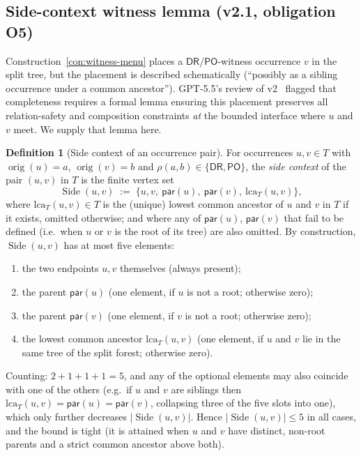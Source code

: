 \documentclass[11pt]{article}
\theoremstyle{definition}
\newtheorem{definition}[theorem]{Definition}
\theoremstyle{remark}
\newcommand{\DR}{\mathsf{DR}}
\newcommand{\PO}{\mathsf{PO}}
\newcommand{\orig}{\operatorname{orig}}
\newcommand{\Side}{\operatorname{Side}}
\begin{document}
\subsection{Side-context witness lemma (v2.1, obligation O5)}
\label{sub:side-context}

Construction~\ref{con:witness-menu} places a $\DR/\PO$-witness
occurrence $v$ in the split tree, but the placement is described
schematically (``possibly as a sibling occurrence under a common
ancestor'').  GPT-5.5's review of v2~\cite{GPT55V2Review}
flagged that completeness requires a
formal lemma ensuring this placement preserves all relation-safety
and composition constraints \emph{at} the bounded interface where
$u$ and $v$ meet.  We supply that lemma here.

\begin{definition}[Side context of an occurrence pair]
\label{def:side-context}
For occurrences $u, v \in T$ with $\orig(u) = a$, $\orig(v) = b$ and
$\rho(a,b) \in \{\DR,\PO\}$, the \emph{side context} of the pair
$(u,v)$ in $T$ is the finite vertex set
\[
\Side(u,v) \;:=\; \{u, v,\ \mathsf{par}(u),\ \mathsf{par}(v),\
\mathrm{lca}_T(u,v)\},
\]
where $\mathrm{lca}_T(u,v) \in T$ is the (unique) lowest common
ancestor of $u$ and $v$ in $T$ if it exists, omitted otherwise; and
where any of $\mathsf{par}(u)$, $\mathsf{par}(v)$ that fail to be
defined (i.e.\ when $u$ or $v$ is the root of its tree) are also
omitted.  By construction, $\Side(u,v)$ has at most five elements:
\begin{enumerate}[label=(\roman*),leftmargin=2em]
\item the two endpoints $u,v$ themselves (always present);
\item the parent $\mathsf{par}(u)$ (one element, if $u$ is not a
  root; otherwise zero);
\item the parent $\mathsf{par}(v)$ (one element, if $v$ is not a
  root; otherwise zero);
\item the lowest common ancestor $\mathrm{lca}_T(u,v)$ (one element,
  if $u$ and $v$ lie in the same tree of the split forest;
  otherwise zero).
\end{enumerate}
Counting: $2 + 1 + 1 + 1 = 5$, and any of the optional elements may
also coincide with one of the others (e.g.\ if $u$ and $v$ are
siblings then $\mathrm{lca}_T(u,v) = \mathsf{par}(u) =
\mathsf{par}(v)$, collapsing three of the five slots into one),
which only further decreases $|\Side(u,v)|$.  Hence $|\Side(u,v)|
\le 5$ in all cases, and the bound is tight (it is attained when
$u$ and $v$ have distinct, non-root parents and a strict common
ancestor above both).
\end{definition}
\end{document}
